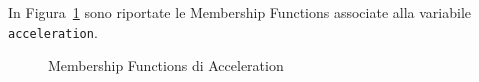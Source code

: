 \noindent In Figura~\ref{Fig:mf_acceleration} sono riportate le Membership Functions associate alla variabile \texttt{acceleration}.
\begin{figure}[H]
    \centering
    \caption{Membership Functions di Acceleration}
    \label{Fig:mf_acceleration}
\end{figure}